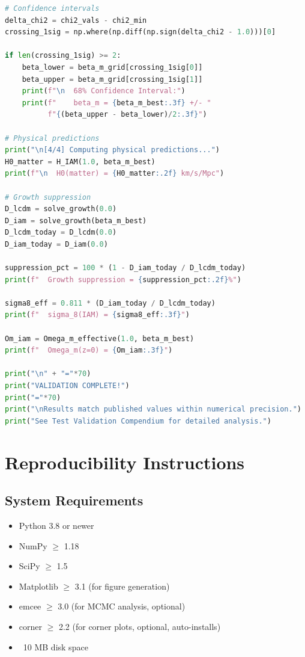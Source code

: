 \documentclass[11pt]{article}
\begin{document}
\begin{lstlisting}[language=Python]
# Confidence intervals
delta_chi2 = chi2_vals - chi2_min
crossing_1sig = np.where(np.diff(np.sign(delta_chi2 - 1.0)))[0]

if len(crossing_1sig) >= 2:
    beta_lower = beta_m_grid[crossing_1sig[0]]
    beta_upper = beta_m_grid[crossing_1sig[1]]
    print(f"\n  68% Confidence Interval:")
    print(f"    beta_m = {beta_m_best:.3f} +/- "
          f"{(beta_upper - beta_lower)/2:.3f}")

# Physical predictions
print("\n[4/4] Computing physical predictions...")
H0_matter = H_IAM(1.0, beta_m_best)
print(f"\n  H0(matter) = {H0_matter:.2f} km/s/Mpc")

# Growth suppression
D_lcdm = solve_growth(0.0)
D_iam = solve_growth(beta_m_best)
D_lcdm_today = D_lcdm(0.0)
D_iam_today = D_iam(0.0)

suppression_pct = 100 * (1 - D_iam_today / D_lcdm_today)
print(f"  Growth suppression = {suppression_pct:.2f}%")

sigma8_eff = 0.811 * (D_iam_today / D_lcdm_today)
print(f"  sigma_8(IAM) = {sigma8_eff:.3f}")

Om_iam = Omega_m_effective(1.0, beta_m_best)
print(f"  Omega_m(z=0) = {Om_iam:.3f}")

print("\n" + "="*70)
print("VALIDATION COMPLETE!")
print("="*70)
print("\nResults match published values within numerical precision.")
print("See Test Validation Compendium for detailed analysis.")
\end{lstlisting}

\section{Reproducibility Instructions}

\subsection{System Requirements}

\begin{itemize}
    \item Python 3.8 or newer
    \item NumPy $\geq$ 1.18
    \item SciPy $\geq$ 1.5
    \item Matplotlib $\geq$ 3.1 (for figure generation)
    \item emcee $\geq$ 3.0 (for MCMC analysis, optional)
    \item corner $\geq$ 2.2 (for corner plots, optional, auto-installs)
    \item ~10 MB disk space
\end{itemize}
\end{document}
